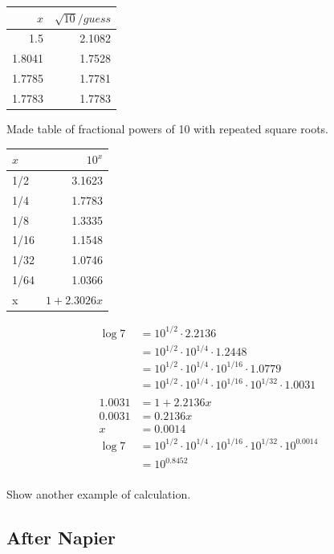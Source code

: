 \documentclass{exam}
\begin{document}
  \begin{tabular}[H]{rr}
    \toprule
    $x$    & $\sqrt{10}/guess$ \\
    \midrule
    1.5    & 2.1082 \\
    1.8041 & 1.7528 \\
    1.7785 & 1.7781 \\
    1.7783 & 1.7783 \\
    \bottomrule
  \end{tabular}

  Made table of fractional powers of 10 with repeated square roots.

  \begin{tabular}[H]{lr}
    \toprule
    $x$ & $10^x$ \\
    \midrule
    1/2 & 3.1623 \\
    1/4 & 1.7783 \\
    1/8 & 1.3335 \\
    1/16 & 1.1548 \\
    1/32 & 1.0746 \\
    1/64 & 1.0366 \\
    x & $1 + 2.3026x$ \\
    \bottomrule
  \end{tabular}

  \begin{align*}
    \log 7 &= 10^{1/2} \cdot 2.2136 \\
           &= 10^{1/2} \cdot 10^{1/4} \cdot 1.2448 \\
           &= 10^{1/2} \cdot 10^{1/4} \cdot 10^{1/16} \cdot 1.0779 \\
           &= 10^{1/2} \cdot 10^{1/4} \cdot 10^{1/16} \cdot 10^{1/32} \cdot 1.0031 \\
    \\
    1.0031 &= 1 + 2.2136x \\
    0.0031  &= 0.2136x \\
    x      &= 0.0014
    \\
    \log 7 &= 10^{1/2} \cdot 10^{1/4} \cdot 10^{1/16} \cdot 10^{1/32} \cdot 10^{0.0014} \\
           &= 10^0.8452 \\
  \end{align*}

  Show another example of calculation.

  \subsection{After Napier}
\end{document}
